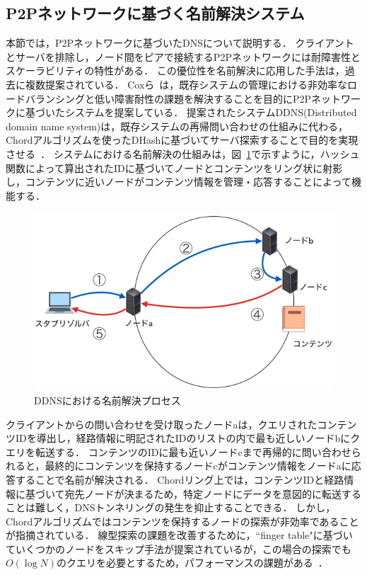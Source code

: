 \subsection{P2Pネットワークに基づく名前解決システム}
本節では，P2Pネットワークに基づいたDNSについて説明する．
クライアントとサーバを排除し，ノード間をピアで接続するP2Pネットワークには耐障害性とスケーラビリティの特性がある．
この優位性を名前解決に応用した手法は，過去に複数提案されている．
Coxら~\cite{cox}は，既存システムの管理における非効率なロードバランシングと低い障害耐性の課題を解決することを目的にP2Pネットワークに基づいたシステムを提案している．
提案されたシステムDDNS(Distributed domain name system)は，既存システムの再帰問い合わせの仕組みに代わる，Chordアルゴリズムを使ったDHashに基づいてサーバ探索することで目的を実現させる~\cite{dhash}．
システムにおける名前解決の仕組みは，図~\ref{fig:chord}で示すように，ハッシュ関数によって算出されたIDに基づいてノードとコンテンツをリング状に射影し，コンテンツに近いノードがコンテンツ情報を管理・応答することによって機能する．
\begin{figure}[bhtp]
 \centering
 \includegraphics[scale=0.4]{figure/chord-mechanism.png}
 \caption{DDNSにおける名前解決プロセス}
 \label{fig:chord}
\end{figure}
クライアントからの問い合わせを受け取ったノードaは，クエリされたコンテンツIDを導出し，経路情報に明記されたIDのリストの内で最も近しいノードbにクエリを転送する．
コンテンツのIDに最も近いノードcまで再帰的に問い合わせられると，最終的にコンテンツを保持するノードcがコンテンツ情報をノードaに応答することで名前が解決される．
Chordリング上では，コンテンツIDと経路情報に基づいて宛先ノードが決まるため，特定ノードにデータを意図的に転送することは難しく，DNSトンネリングの発生を抑止することできる．
しかし，Chordアルゴリズムではコンテンツを保持するノードの探索が非効率であることが指摘されている．
線型探索の課題を改善するために，``finger table"に基づいていくつかのノードをスキップ手法が提案されているが，この場合の探索でも$O(\log N)$のクエリを必要とするため，パフォーマンスの課題がある~\cite{p_donas}．

